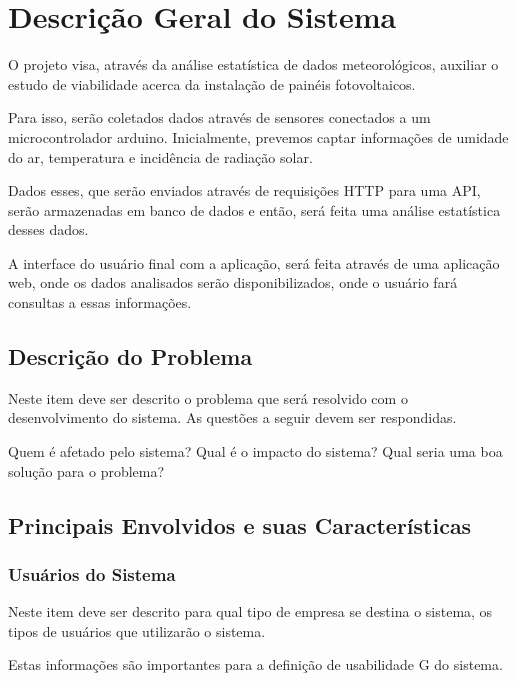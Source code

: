 \chapter{Descrição Geral do Sistema}


O projeto visa, através da análise estatística de dados meteorológicos, auxiliar o estudo de viabilidade acerca da instalação de painéis fotovoltaicos.

Para isso, serão coletados dados através de sensores conectados a um microcontrolador arduino. Inicialmente, prevemos captar informações de umidade do ar, temperatura e incidência de radiação solar.

Dados esses, que serão enviados através de requisições HTTP para uma API, serão armazenadas em banco de dados e então, será feita uma análise estatística desses dados.

A interface do usuário final com a aplicação, será feita através de uma aplicação web, onde os dados analisados serão disponibilizados, onde o usuário fará consultas a essas informações.

\section{Descrição do Problema}

Neste item deve ser descrito o problema que será resolvido com o desenvolvimento do sistema. As questões a seguir devem ser respondidas.

Quem é afetado pelo sistema?
Qual é o impacto do sistema?
Qual seria uma boa solução para o problema?

\section{Principais Envolvidos e suas Características}

\subsection{Usuários do Sistema}

Neste item deve ser descrito para qual tipo de empresa se destina o sistema, os tipos de usuários que utilizarão o sistema.

Estas informações são importantes para a definição de usabilidade G do sistema.

